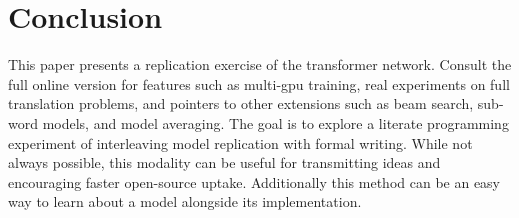 \documentclass[11pt,a4paper]{article}
\begin{document}

\section{Conclusion}


This paper presents a replication exercise of
  the transformer network. Consult the
  full online version for features such as multi-gpu
  training, real experiments on full translation problems, and
  pointers to other extensions such as beam search, sub-word models,
  and model averaging.
  The goal is to explore a literate programming experiment of
  interleaving model replication with formal writing. While not always
  possible, this modality can be useful for transmitting ideas and
  encouraging faster open-source uptake. Additionally this method can
  be an easy way to learn about a model alongside its implementation.






    
\end{document}
